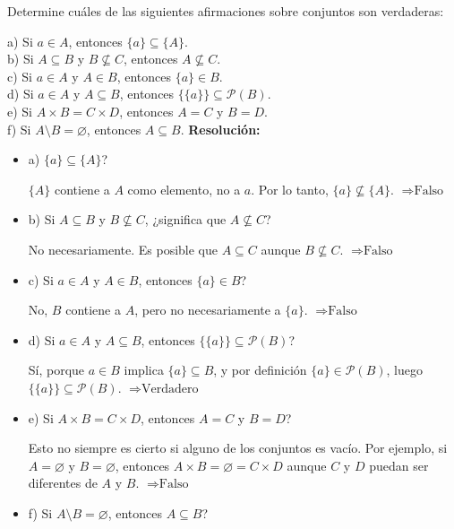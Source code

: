 \documentclass[a4paper,12pt]{article}
\begin{document}
\begin{ejercicio}[title=Ejercicio 10]
Determine cuáles de las siguientes afirmaciones sobre conjuntos son verdaderas:

a) Si $a\in A$, entonces $\{a\}\subseteq \{A\}$.\\
b) Si $A\subseteq B$ y $B\not\subseteq C$, entonces $A\not\subseteq C$.\\
c) Si $a\in A$ y $A\in B$, entonces $\{a\}\in B$.\\
d) Si $a\in A$ y $A\subseteq B$, entonces $\{\{a\}\}\subseteq \mathcal{P}(B)$.\\
e) Si $A\times B = C\times D$, entonces $A=C$ y $B=D$.\\
f) Si $A\setminus B = \varnothing$, entonces $A\subseteq B$.
\tcblower
\textbf{Resolución:}

\begin{itemize}
\item a) $\{a\}\subseteq \{A\}$?  

\(\{A\}\) contiene a \(A\) como elemento, no a \(a\). Por lo tanto, \(\{a\} \not\subseteq \{A\}\).  
\(\Rightarrow \text{Falso}\)

\item b) Si $A\subseteq B$ y $B\not\subseteq C$, ¿significa que $A\not\subseteq C$?  

No necesariamente. Es posible que $A\subseteq C$ aunque $B\not\subseteq C$.  
\(\Rightarrow \text{Falso}\)

\item c) Si $a\in A$ y $A\in B$, entonces $\{a\}\in B$?  

No, $B$ contiene a $A$, pero no necesariamente a $\{a\}$.  
\(\Rightarrow \text{Falso}\)

\item d) Si $a\in A$ y $A\subseteq B$, entonces $\{\{a\}\}\subseteq \mathcal{P}(B)$?  

Sí, porque $a \in B$ implica $\{a\} \subseteq B$, y por definición $\{a\} \in \mathcal{P}(B)$, luego $\{\{a\}\} \subseteq \mathcal{P}(B)$.  
\(\Rightarrow \text{Verdadero}\)

\item e) Si $A\times B = C\times D$, entonces $A=C$ y $B=D$?  

Esto no siempre es cierto si alguno de los conjuntos es vacío. Por ejemplo, si $A=\varnothing$ y $B=\varnothing$, entonces $A\times B = \varnothing = C\times D$ aunque $C$ y $D$ puedan ser diferentes de $A$ y $B$.  
\(\Rightarrow \text{Falso}\)

\item f) Si $A\setminus B = \varnothing$, entonces $A\subseteq B$?  


\end{itemize}
\end{ejercicio}
\end{document}
